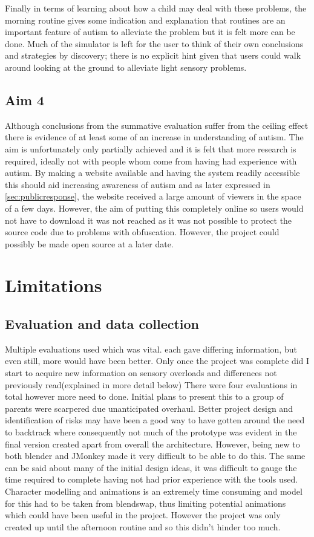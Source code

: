 Finally in terms of learning about how a child may deal with these problems, the morning routine gives some indication and explanation that routines are an important feature of autism to alleviate the problem but it is felt more can be done. Much of the simulator is left for the user to think of their own conclusions and strategies by discovery; there is no explicit hint given that users could walk around looking at the ground to alleviate light sensory problems.


\subsection*{Aim 4}
Although conclusions from the summative evaluation suffer from the ceiling effect there is evidence of at least some of an increase in understanding of autism. The aim is unfortunately only partially achieved and it is felt that more research is required, ideally not with people whom come from having had experience with autism. By making a website available and having the system readily accessible this should aid increasing awareness of autism and as later expressed in \ref{sec:publicresponse}, the website received a large amount of viewers in the space of a few days. However, the aim of putting this completely online so users would not have to download it was not reached as it was not possible to protect the source code due to problems with obfuscation. However, the project could possibly be made open source at a later date.


\section{Limitations}

\subsection{Evaluation and data collection}
Multiple evaluations used which was vital. each gave differing information, but even still, more would have been better. Only once the project was complete did I start to acquire new information on sensory overloads and differences not previously read(explained in more detail below)
There were four evaluations in total however more need to done. Initial plans to present this to a group of parents were scarpered due unanticipated overhaul.
Better project design and identification of risks may have been a good way to have gotten around the need to backtrack where consequently not much of the prototype was evident in the final version created apart from overall the architecture. However, being new to both blender and JMonkey made it very difficult to be able to do this. The same can be said about many of the initial design ideas, it was difficult to gauge the time required to complete having not had prior experience with the tools used. Character modelling and animations is an extremely time consuming and model for this had to be taken from blendswap, thus limiting potential animations which could have been useful in the project. However the project was only created up until the afternoon routine and so this didn't hinder too much.

